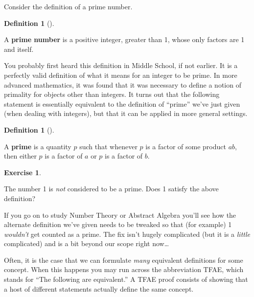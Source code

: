 \documentclass[10pt,]{book}
\newcommand{\terminology}[1]{\textbf{#1}}
\theoremstyle{plain}
\theoremstyle{definition}
\newtheorem{definition}[theorem]{Definition}
\theoremstyle{definition}
\newtheorem{exercise}[theorem]{Exercise}
\numberwithin{equation}{section}
\begin{document}
    Consider the definition of a prime number.
\begin{definition}[{}]\label{definition-1}

        A \terminology{prime number} is a positive integer,
        greater than 1, whose only factors are 1 and itself.
\end{definition}
\par

    You probably first heard this definition in Middle School, if not
    earlier. It is a perfectly valid definition of what it means
    for an integer to be prime. In more advanced mathematics, it
    was found that it was necessary to define a notion of primality
    for objects other than integers. It turns out that the following
    statement is essentially equivalent to the definition of ``prime'' we've just
    given (when dealing with integers), but that it can be applied in
    more general settings.
\begin{definition}[{}]\label{definition-2}

        A \terminology{prime} is a quantity \(p\) such that whenever \(p\) is a
        factor of some product \(ab\), then either \(p\) is a factor of
        \(a\) or \(p\) is a factor of \(b\).
\end{definition}
\begin{exercise}\label{exercise-1}

        The number 1 is \emph{not} considered to be a prime. Does
        1 satisfy the above definition?
\end{exercise}
\par

    If you go on to study Number Theory or Abstract Algebra you'll see how
    the alternate definition we've given needs to be tweaked so that (for example)
    1 \emph{wouldn't} get counted as a prime. The fix isn't hugely complicated (but it
    is a \emph{little} complicated) and is a bit beyond our scope right now\dots{}
\par

    Often, it is the case that we can formulate \emph{many} equivalent
    definitions for some concept. When this happens you may run
    across the abbreviation TFAE, which stands for ``The following
    are equivalent.'' A TFAE proof consists of showing that a host
    of different statements actually define the same concept.
\par
\end{document}

